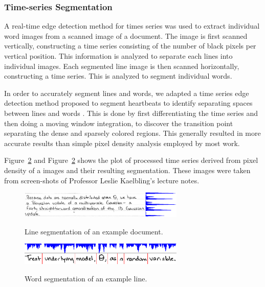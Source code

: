 \documentclass[12pt]{article}
\begin{document}
		\subsubsection{Time-series Segmentation}
		A real-time edge detection method for times series was used to extract individual word images from a scanned image of a document. The image is first scanned vertically, constructing a time series consisting of the number of black pixels per vertical position. This information is analyzed to separate each lines into individual images. Each segmented line image is then scanned horizontally, constructing a time series. This is analyzed to segment individual words.
		
		In order to accurately segment lines and words, we adapted a time series edge detection method proposed to segment heartbeats to identify separating spaces between lines and words \cite{QRS}. This is done by first differentiating the time series and then doing a moving window integration, to discover the transition point separating the dense and sparsely colored regions. This generally resulted in more accurate results than simple pixel density analysis employed by most work.
		
		Figure~\ref{figure:word_segmentation} and Figure~\ref{figure:word_segmentation} shows the plot of processed time series derived from pixel density of a images and their resulting segmentation. These images were taken from screen-shots of Professor Leslie Kaelbling's lecture notes.


		\begin{figure}[htbp!]
		\centering
		\includegraphics[width=0.7\textwidth]{line_segmentation.eps}
		\label{figure:line_segmentation}
		\caption{Line segmentation of an example document.}
		\end{figure}
		
		\begin{figure}[htbp!]
		\centering
		\includegraphics[width=0.7\textwidth]{word_segmentation.eps}
		\label{figure:word_segmentation}
		\caption{Word segmentation of an example line.}
		\end{figure}
\end{document}
